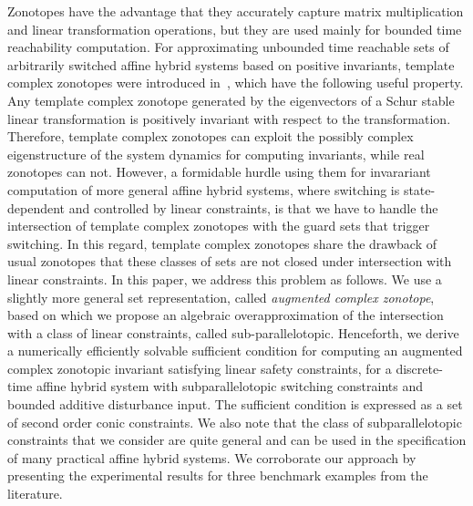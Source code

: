 Zonotopes have the advantage that they accurately capture matrix
multiplication and linear transformation operations, but they are used
mainly for bounded time reachability computation.  For approximating
unbounded time reachable sets of arbitrarily switched affine hybrid
systems based on positive invariants, template complex zonotopes were
introduced in~\cite{tcz2017}, which have the following useful
property.  Any template complex zonotope generated by the eigenvectors
of a Schur stable linear transformation is positively invariant with
respect to the transformation.  Therefore, template complex zonotopes
can exploit the possibly complex eigenstructure of the system dynamics
for computing invariants, while real zonotopes can not.  However, a
formidable hurdle using them for invarariant computation of more
general affine hybrid systems, where switching is state-dependent and
controlled by linear constraints, is that we have to handle the
intersection of template complex zonotopes with the guard sets that
trigger switching. In this regard, template complex zonotopes share
the drawback of usual zonotopes that these classes of sets are not
closed under intersection with linear constraints. In this paper, we
address this problem as follows. We use a slightly more general set
representation, called \emph{augmented complex zonotope}, based on
which we propose an algebraic overapproximation of the intersection
with a class of linear constraints, called sub-parallelotopic.
Henceforth, we derive a numerically efficiently solvable sufficient
condition for computing an augmented complex zonotopic invariant
satisfying linear safety constraints, for a discrete-time affine
hybrid system with subparallelotopic switching constraints and bounded
additive disturbance input.  The sufficient condition is expressed as
a set of second order conic constraints.  We also note that the class
of subparallelotopic constraints that we consider are quite general
and can be used in the specification of many practical affine hybrid
systems. We corroborate our approach by presenting the experimental
results for three benchmark examples from the literature.


